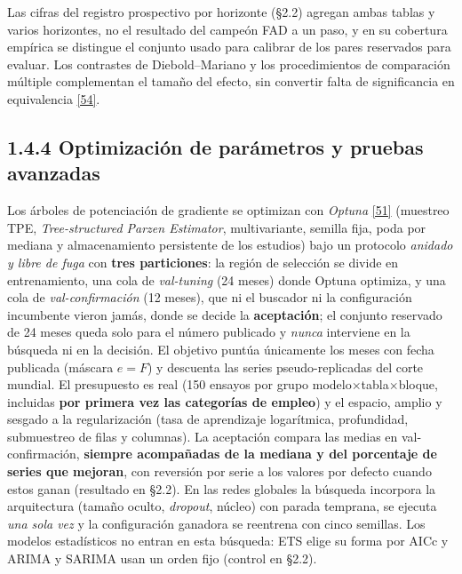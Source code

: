 \documentclass[12pt,letterpaper]{report}
\newcommand{\cita}[1]{\hyperref[bib:#1]{[#1]}}
\begin{document}
Las cifras del registro prospectivo por horizonte (§2.2) agregan ambas tablas y varios
horizontes, no el resultado del campeón FAD a un paso, y en su cobertura empírica se distingue el
conjunto usado para calibrar de los pares reservados para evaluar. Los contrastes de
Diebold--Mariano y los procedimientos de comparación múltiple complementan el tamaño
del efecto, sin convertir falta de significancia en equivalencia \cita{54}.

\subsection{1.4.4 Optimización de parámetros y pruebas avanzadas}

Los árboles de potenciación de gradiente se optimizan con \textit{Optuna} \cita{51}
(muestreo TPE, \textit{Tree-structured Parzen Estimator}, multivariante, semilla fija, poda por
mediana y almacenamiento persistente de los estudios) bajo un protocolo \textit{anidado y libre
de fuga} con \textbf{tres particiones}: la región de selección se divide en entrenamiento, una
cola de \textit{val-tuning} (24 meses) donde Optuna optimiza, y una cola de
\textit{val-confirmación} (12 meses), que ni el buscador ni la configuración incumbente vieron
jamás, donde se decide la \textbf{aceptación}; el conjunto reservado de 24 meses queda solo para
el número publicado y \textit{nunca} interviene en la búsqueda ni en la decisión. El objetivo
puntúa únicamente los meses con fecha publicada (máscara $e=F$) y descuenta las series
pseudo-replicadas del corte mundial. El presupuesto es real (150 ensayos por grupo
modelo$\times$tabla$\times$bloque, incluidas \textbf{por primera vez las categorías de empleo})
y el espacio, amplio y sesgado a la regularización (tasa de aprendizaje logarítmica,
profundidad, submuestreo de filas y columnas). La aceptación compara las medias en
val-confirmación, \textbf{siempre acompañadas de la mediana y del porcentaje de series que
mejoran}, con reversión por serie a los valores por defecto cuando estos ganan (resultado en
§2.2). En las redes globales la búsqueda incorpora la arquitectura (tamaño oculto,
\textit{dropout}, núcleo) con parada temprana, se ejecuta \textit{una sola vez} y la
configuración ganadora se reentrena con cinco semillas. Los modelos estadísticos no entran en
esta búsqueda: ETS elige su forma por AICc y ARIMA y SARIMA usan un orden fijo (control en §2.2).
\end{document}
